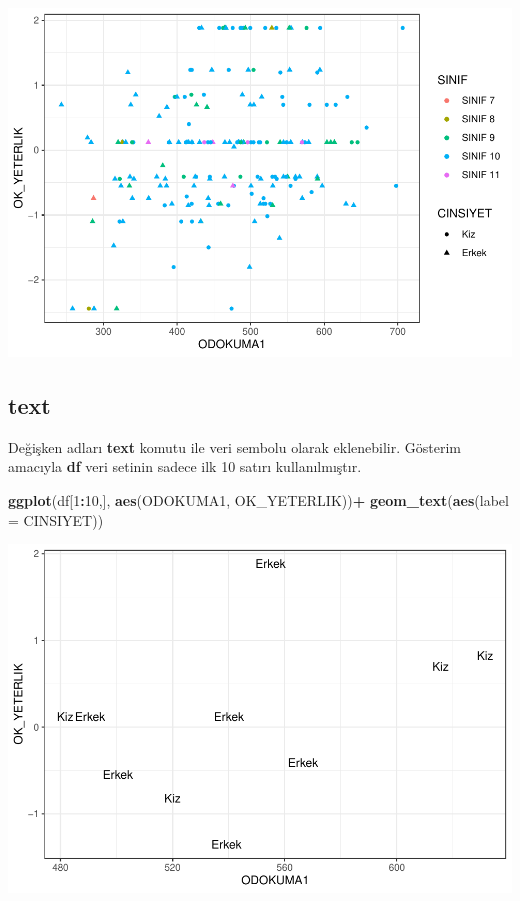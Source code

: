 \documentclass[
  oneside]{book}
\newenvironment{Shaded}{\begin{snugshade}}{\end{snugshade}}
\newcommand{\AttributeTok}[1]{\textcolor[rgb]{0.13,0.29,0.53}{#1}}
\newcommand{\DecValTok}[1]{\textcolor[rgb]{0.00,0.00,0.81}{#1}}
\newcommand{\FunctionTok}[1]{\textcolor[rgb]{0.13,0.29,0.53}{\textbf{#1}}}
\newcommand{\NormalTok}[1]{#1}
\newcommand{\SpecialCharTok}[1]{\textcolor[rgb]{0.81,0.36,0.00}{\textbf{#1}}}
\begin{document}
\begin{center}\includegraphics[width=1\linewidth]{15-betimleyici-istatistik_files/figure-latex/unnamed-chunk-49-1} \end{center}

\hypertarget{text}{%
\subsection{\texorpdfstring{\textbf{text}}{text}}\label{text}}

Değişken adları \textbf{text} komutu ile veri sembolu olarak eklenebilir. Gösterim amacıyla \textbf{df} veri setinin sadece ilk 10 satırı kullanılmıştır.

\begin{Shaded}
\begin{Highlighting}[]
\FunctionTok{ggplot}\NormalTok{(df[}\DecValTok{1}\SpecialCharTok{:}\DecValTok{10}\NormalTok{,], }\FunctionTok{aes}\NormalTok{(ODOKUMA1, OK\_YETERLIK))}\SpecialCharTok{+}
         \FunctionTok{geom\_text}\NormalTok{(}\FunctionTok{aes}\NormalTok{(}\AttributeTok{label =}\NormalTok{ CINSIYET))}
\end{Highlighting}
\end{Shaded}

\begin{center}\includegraphics[width=1\linewidth]{15-betimleyici-istatistik_files/figure-latex/unnamed-chunk-50-1} \end{center}
\end{document}
